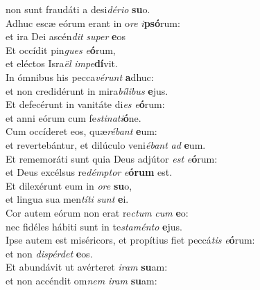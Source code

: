 \oddverse non sunt fraudáti a desi\textit{dé}\textit{ri}\textit{o} \textbf{su}o.\\
\evenverse Adhuc escæ eórum erant in o\textit{re} \textit{i}\textbf{psó}rum:~\*\\
\evenverse et ira Dei ascén\textit{dit} \textit{su}\textit{per} \textbf{e}os\\
\oddverse Et occídit pin\textit{gues} \textit{e}\textbf{ó}rum,~\*\\
\oddverse et eléctos Isra\textit{ël} \textit{im}\textit{pe}\textbf{dí}vit.\\
\evenverse In ómnibus his pecca\textit{vé}\textit{runt} \textbf{a}dhuc:~\*\\
\evenverse et non credidérunt in mira\textit{bí}\textit{li}\textit{bus} \textbf{e}jus.\\
\oddverse Et defecérunt in vanitáte di\textit{es} \textit{e}\textbf{ó}rum:~\*\\
\oddverse et anni eórum cum fe\textit{sti}\textit{na}\textit{ti}\textbf{ó}ne.\\
\evenverse Cum occíderet eos, quæ\textit{ré}\textit{bant} \textbf{e}um:~\*\\
\evenverse et revertebántur, et dilúculo veni\textit{é}\textit{bant} \textit{ad} \textbf{e}um.\\
\oddverse Et rememoráti sunt quia Deus adjútor \textit{est} \textit{e}\textbf{ó}rum:~\*\\
\oddverse et Deus excélsus re\textit{dém}\textit{ptor} \textit{e}\textbf{ó}\textbf{rum} est.\\
\evenverse Et dilexérunt eum in \textit{o}\textit{re} \textbf{su}o,~\*\\
\evenverse et lingua sua men\textit{tí}\textit{ti} \textit{sunt} \textbf{e}i.\\
\oddverse Cor autem eórum non erat re\textit{ctum} \textit{cum} \textbf{e}o:~\*\\
\oddverse nec fidéles hábiti sunt in te\textit{sta}\textit{mén}\textit{to} \textbf{e}jus.\\
\evenverse Ipse autem est miséricors, et propítius fiet peccá\textit{tis} \textit{e}\textbf{ó}rum:~\*\\
\evenverse et non \textit{di}\textit{spér}\textit{det} \textbf{e}os.\\
\oddverse Et abundávit ut avérteret \textit{i}\textit{ram} \textbf{su}am:~\*\\
\oddverse et non accéndit om\textit{nem} \textit{i}\textit{ram} \textbf{su}am:\\
